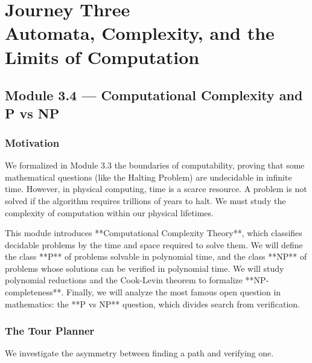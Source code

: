 \documentclass[12pt, a4paper]{book}
\begin{document}
\setcounter{chapter}{2}
\chapter[Journey 3 --- Automata, Complexity, and the Limits of Computation]
        {Journey Three\\[8pt]
         \textcolor{ModuleColor}{\large Automata, Complexity, and the Limits of Computation}}
\setcounter{section}{3}

\section{Module 3.4 --- Computational Complexity and P vs NP}
\label{sec:mod3.4}

\subsection*{Motivation}

We formalized in Module 3.3 the boundaries of computability, proving that some mathematical questions (like the Halting Problem) are undecidable in infinite time.
However, in physical computing, time is a scarce resource. A problem is not solved if the algorithm requires trillions of years to halt.
We must study the complexity of computation within our physical lifetimes.

This module introduces **Computational Complexity Theory**, which classifies decidable problems by the time and space required to solve them.
We will define the class **P** of problems solvable in polynomial time, and the class **NP** of problems whose solutions can be verified in polynomial time.
We will study polynomial reductions and the Cook-Levin theorem to formalize **NP-completeness**.
Finally, we will analyze the most famous open question in mathematics: the **$\text{P}$ vs $\text{NP}$** question, which divides search from verification.

\subsection{The Tour Planner}

We investigate the asymmetry between finding a path and verifying one.
\end{document}
